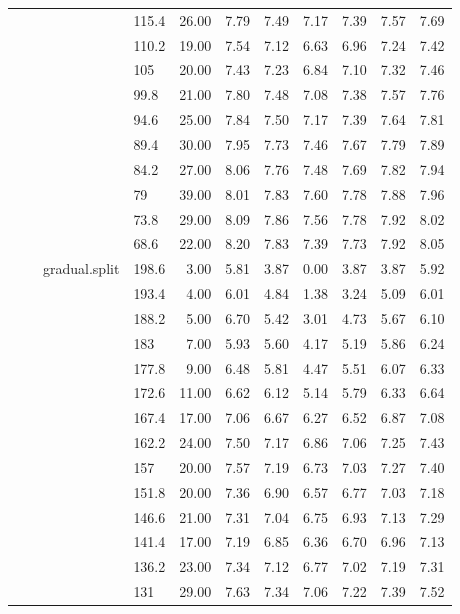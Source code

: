 \begin{longtable}{llllrrrrrrr}
   &  &  & 115.4 & 26.00 & 7.79 & 7.49 & 7.17 & 7.39 & 7.57 & 7.69 \\ 
   &  &  & 110.2 & 19.00 & 7.54 & 7.12 & 6.63 & 6.96 & 7.24 & 7.42 \\ 
   &  &  & 105 & 20.00 & 7.43 & 7.23 & 6.84 & 7.10 & 7.32 & 7.46 \\ 
   &  &  & 99.8 & 21.00 & 7.80 & 7.48 & 7.08 & 7.38 & 7.57 & 7.76 \\ 
   &  &  & 94.6 & 25.00 & 7.84 & 7.50 & 7.17 & 7.39 & 7.64 & 7.81 \\ 
   &  &  & 89.4 & 30.00 & 7.95 & 7.73 & 7.46 & 7.67 & 7.79 & 7.89 \\ 
   &  &  & 84.2 & 27.00 & 8.06 & 7.76 & 7.48 & 7.69 & 7.82 & 7.94 \\ 
   &  &  & 79 & 39.00 & 8.01 & 7.83 & 7.60 & 7.78 & 7.88 & 7.96 \\ 
   &  &  & 73.8 & 29.00 & 8.09 & 7.86 & 7.56 & 7.78 & 7.92 & 8.02 \\ 
   &  &  & 68.6 & 22.00 & 8.20 & 7.83 & 7.39 & 7.73 & 7.92 & 8.05 \\ 
   &  & gradual.split & 198.6 & 3.00 & 5.81 & 3.87 & 0.00 & 3.87 & 3.87 & 5.92 \\ 
   &  &  & 193.4 & 4.00 & 6.01 & 4.84 & 1.38 & 3.24 & 5.09 & 6.01 \\ 
   &  &  & 188.2 & 5.00 & 6.70 & 5.42 & 3.01 & 4.73 & 5.67 & 6.10 \\ 
   &  &  & 183 & 7.00 & 5.93 & 5.60 & 4.17 & 5.19 & 5.86 & 6.24 \\ 
   &  &  & 177.8 & 9.00 & 6.48 & 5.81 & 4.47 & 5.51 & 6.07 & 6.33 \\ 
   &  &  & 172.6 & 11.00 & 6.62 & 6.12 & 5.14 & 5.79 & 6.33 & 6.64 \\ 
   &  &  & 167.4 & 17.00 & 7.06 & 6.67 & 6.27 & 6.52 & 6.87 & 7.08 \\ 
   &  &  & 162.2 & 24.00 & 7.50 & 7.17 & 6.86 & 7.06 & 7.25 & 7.43 \\ 
   &  &  & 157 & 20.00 & 7.57 & 7.19 & 6.73 & 7.03 & 7.27 & 7.40 \\ 
   &  &  & 151.8 & 20.00 & 7.36 & 6.90 & 6.57 & 6.77 & 7.03 & 7.18 \\ 
   &  &  & 146.6 & 21.00 & 7.31 & 7.04 & 6.75 & 6.93 & 7.13 & 7.29 \\ 
   &  &  & 141.4 & 17.00 & 7.19 & 6.85 & 6.36 & 6.70 & 6.96 & 7.13 \\ 
   &  &  & 136.2 & 23.00 & 7.34 & 7.12 & 6.77 & 7.02 & 7.19 & 7.31 \\ 
   &  &  & 131 & 29.00 & 7.63 & 7.34 & 7.06 & 7.22 & 7.39 & 7.52 \\ 

\end{longtable}
